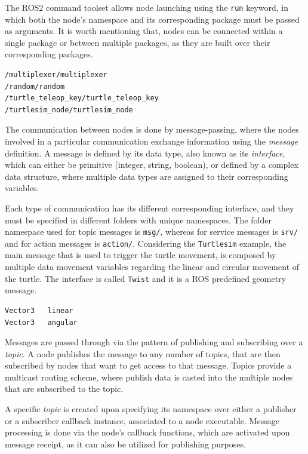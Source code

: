 The ROS2 command toolset allows node launching using the \texttt{run} keyword, in which both the node's namespace and its corresponding package must be passed as arguments. It is worth mentioning that, nodes can be connected within a single package or between multiple packages, as they are built over their corresponding packages.

\begin{lstlisting}[title={The \texttt{TurtleSim} node list.}]
/multiplexer/multiplexer
/random/random
/turtle_teleop_key/turtle_teleop_key
/turtlesim_node/turtlesim_node
\end{lstlisting}

The communication between nodes is done by message-passing, where the nodes involved in a particular communication exchange information using the \textit{message} definition. A message is defined by its data type, also known as its \textit{interface}, which can either be primitive (integer, string, boolean), or defined by a complex data structure, where multiple data types are assigned to their corresponding variables. 

Each type of communication has its different corresponding interface, and they must be specified in different folders with unique namespaces. The folder namespace used for topic messages is \texttt{msg/}, whereas for service messages is \texttt{srv/} and for action messages is \texttt{action/}. Considering the \texttt{Turtlesim} example, the main message that is used to trigger the turtle movement, is composed by multiple data movement variables regarding the linear and circular movement of the turtle. The interface is called \texttt{Twist} and it is a ROS predefined geometry message.

\begin{lstlisting}[title={\texttt{Twist.msg} interface file that is used to trigger the turtle movement.}]
Vector3   linear
Vector3   angular
\end{lstlisting}

Messages are passed through via the pattern of publishing and subscribing over a \textit{topic}. A node publishes the message to any number of topics, that are then subscribed by nodes that want to get access to that message. Topics provide a multicast routing scheme, where publish data is casted into the multiple nodes that are subscribed to the topic. 

A specific \textit{topic} is created upon specifying its namespace over either a publisher or a subscriber callback instance, associated to a node executable. Message processing is done via the node's callback functions, which are activated upon message receipt, as it can also be utilized for publishing purposes. \cite{casini2019response} %

